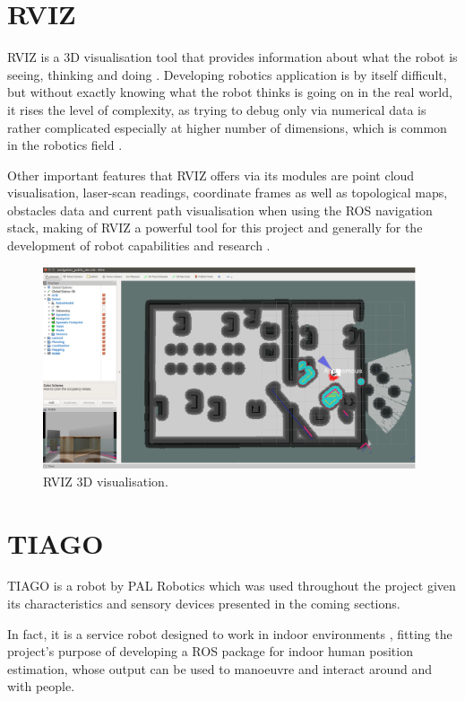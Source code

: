 \section{RVIZ}

RVIZ is a 3D visualisation tool that provides information about what the robot is seeing, thinking and doing \cite{website:RVIZ}. Developing robotics application is by itself difficult, but without exactly knowing what the robot thinks is going on in the real world, it rises the level of complexity, as trying to debug only via numerical data is rather complicated especially at higher number of dimensions, which is common in the robotics field \cite{website:RVIZ}. 

Other important features that RVIZ offers via its modules are point cloud visualisation, laser-scan readings, coordinate frames as well as topological maps, obstacles data and current path visualisation when using the ROS navigation stack, making of RVIZ a powerful tool for this project and generally for the development of robot capabilities and research \cite{website:RVIZ}.

\begin{figure}[H]
\begin{center}
\includegraphics[width=11cm]{images/chapter2_rviz_screenshot.png}
\end{center}
\caption{RVIZ 3D visualisation.}
\label{fig:rviz_screenshot}
\end{figure}

\section{TIAGO}

TIAGO is a robot by PAL Robotics which was used throughout the project given its characteristics and sensory devices presented in the coming sections. 

In fact, it is a service robot designed to work in indoor environments \cite{website:TIAGo}, fitting the project's purpose of developing a ROS package for indoor human position estimation, whose output can be used to manoeuvre and interact around and with people.

